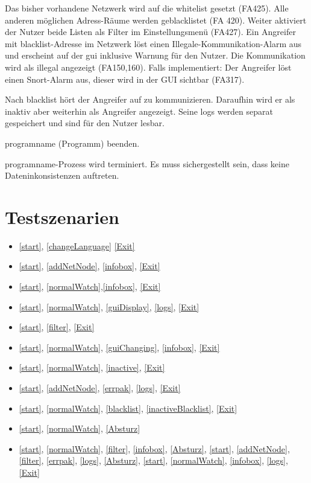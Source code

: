 \begin{description}[style=multiline, leftmargin=4cm, labelwidth=4cm]
  \item[\namedlabel{blacklist}{Blacklist}] Das bisher vorhandene Netzwerk wird auf die \gls{whitelist} gesetzt (FA425). Alle anderen möglichen Adress-Räume werden geblacklistet (FA 420). Weiter aktiviert der Nutzer beide Listen als Filter im Einstellungsmenü (FA427). Ein Angreifer mit \gls{blacklist}-Adresse im Netzwerk löst einen Illegale-Kommunikation-Alarm aus und erscheint auf der \gls{gui} inklusive Warnung für den Nutzer. Die Kommunikation wird als illegal angezeigt (FA150,160). Falls implementiert: Der Angreifer löst einen Snort-Alarm aus, dieser wird in der GUI sichtbar (FA317).
  \item[\namedlabel{inactiveBlacklist}{Inaktiver geblacklisteter Teilnehmer}] Nach \gls{blacklist} hört der Angreifer auf zu kommunizieren. Daraufhin wird er als inaktiv aber weiterhin als Angreifer angezeigt. Seine \glspl{log} werden separat gespeichert und sind für den Nutzer lesbar.
  \item[\namedlabel{Exit}{Exit}] \gls{programname} (Programm) beenden.
  \item[\namedlabel{Absturz}{Absturz}] \gls{programname}-Prozess wird terminiert. Es muss sichergestellt sein, dass keine Dateninkonsistenzen auftreten.
\end{description}

\section{Testszenarien}

\begin{itemize}
  \item \ref{start}, \ref{changeLanguage} \ref{Exit}
  \item \ref{start}, \ref{addNetNode}, \ref{infobox}, \ref{Exit}
  \item \ref{start}, \ref{normalWatch},\ref{infobox}, \ref{Exit}
  \item \ref{start}, \ref{normalWatch}, \ref{guiDisplay}, \ref{logs}, \ref{Exit}
  \item \ref{start}, \ref{filter}, \ref{Exit}
  \item \ref{start}, \ref{normalWatch}, \ref{guiChanging}, \ref{infobox}, \ref{Exit}
  \item \ref{start}, \ref{normalWatch}, \ref{inactive}, \ref{Exit}
  \item \ref{start}, \ref{addNetNode}, \ref{errpak}, \ref{logs}, \ref{Exit}
  \item \ref{start}, \ref{normalWatch}, \ref{blacklist}, \ref{inactiveBlacklist}, \ref{Exit}
  \item \ref{start}, \ref{normalWatch}, \ref{Absturz}
  \item \ref{start}, \ref{normalWatch}, \ref{filter}, \ref{infobox}, \ref{Absturz}, \ref{start}, \ref{addNetNode}, \ref{filter}, \ref{errpak}, \ref{logs}, \ref{Absturz}, \ref{start}, \ref{normalWatch}, \ref{infobox}, \ref{logs}, \ref{Exit}
\end{itemize}
